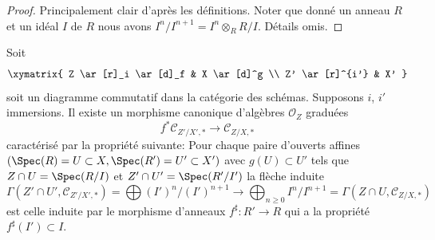\begin{proof}
Principalement clair d'après les définitions. Noter que donné un anneau
 $R$  et un idéal  $I$  de  $R$  nous avons  $I^n/I^{n + 1} = I^n \otimes_R R/I$.
Détails omis.
\end{proof}

\begin{lemma}
\label{lemma-conormal-algebra-functorial}
Soit
$$
\xymatrix{
Z \ar[r]_i \ar[d]_f & X \ar[d]^g \\
Z' \ar[r]^{i'} & X'
}
$$
soit un diagramme commutatif dans la catégorie des schémas. Supposons
 $i$,  $i'$  immersions. Il existe un morphisme canonique d'algèbres
 $\mathcal{O}_Z$ graduées
$$
f^*\mathcal{C}_{Z'/X', *}
\longrightarrow
\mathcal{C}_{Z/X, *}
$$
caractérisé par la propriété suivante: Pour chaque paire d'ouverts affines
 $(\Spec(R) = U \subset X, \Spec(R') = U' \subset X')$  avec  $g(U) \subset U'$  tels que  $Z \cap U = \Spec(R/I)$  et  $Z' \cap U' = \Spec(R'/I')$  la flèche
induite
$$
\Gamma(Z' \cap U', \mathcal{C}_{Z'/X', *}) =
\bigoplus\nolimits (I')^n/(I')^{n + 1}
\longrightarrow
\bigoplus\nolimits_{n \geq 0} I^n/I^{n + 1} =
\Gamma(Z \cap U, \mathcal{C}_{Z/X, *})
$$
est celle induite par le morphisme d'anneaux  $f^\sharp : R' \to R$  qui a la propriété
 $f^\sharp(I') \subset I$.
\end{lemma}

